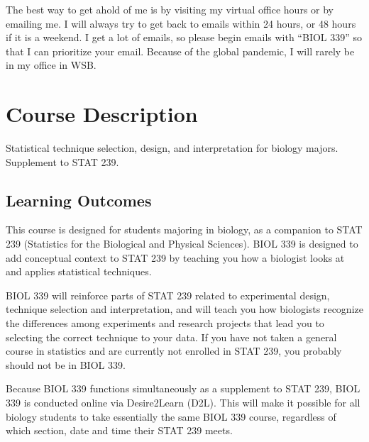 \documentclass{tufte-handout}
\begin{document}
\begin{fullwidth}

 The best way to get ahold of me is by visiting my virtual office hours or by emailing me. I will always try to get back to emails within 24 hours, or 48 hours if it is a weekend. I get a lot of emails, so please begin emails with ``BIOL 339'' so that I can prioritize your email. Because of the global pandemic, I will rarely be in my office in WSB.

\section{Course Description}

Statistical technique selection, design, and interpretation for biology majors. Supplement to STAT 239. 

\subsection{Learning Outcomes}

This course is designed for students majoring in biology, as a companion to STAT 239 (Statistics for the Biological and Physical Sciences). BIOL 339 is designed to add conceptual context to STAT 239 by teaching you how a biologist looks at and applies statistical techniques.

BIOL 339 will reinforce parts of STAT 239 related to experimental design, technique selection and interpretation, and will teach you how biologists recognize the differences among experiments and research projects that lead you to selecting the correct technique to your data. If you have not taken a general course in statistics and are currently not enrolled in STAT 239, you probably should not be in BIOL 339.

Because BIOL 339 functions simultaneously as a supplement to STAT 239, BIOL 339 is conducted online via Desire2Learn (D2L). This will make it possible for all biology students to take essentially the same BIOL 339 course, regardless of which section, date and time their STAT 239 meets. 



\end{fullwidth}
\end{document}
